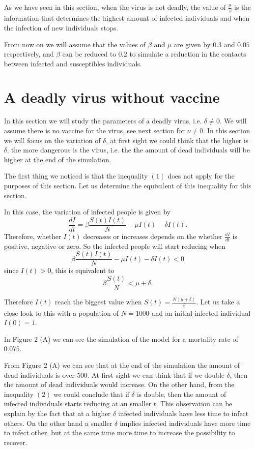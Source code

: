 \documentclass[14pt]{amsart}
\begin{document}
As we have seen in this section, when the virus is not deadly, the value of $\frac{\mu}{\beta}$ is the information that determines the highest amount of infected individuals and when the infection of new individuals stops.

From now on we will assume that the values of $\beta$ and $\mu$ are given by $0.3$ and $0.05$ respectively, and $\beta$ can be reduced to $0.2$ to simulate a reduction in the contacts between infected and susceptibles individuals.

\section{A deadly virus without vaccine}

In this section we will study the parameters of a deadly virus, i.e. $\delta \neq 0$. We will assume there is no vaccine for the virus, see next section for $\nu \neq 0$. In this section we will focus on the variation of $\delta$, at first sight we could think that the higher is $\delta$, the more dangerous is the virus, i.e. the the amount of dead individuals will be higher at the end of the simulation.

The first thing we noticed is that the inequality $(1)$ does not apply for the purposes of this section. Let us determine the equivalent of this inequality for this section.

In this case, the variation of infected people is given by     
$$\frac{d I}{dt}= \beta \frac{S(t)I(t)}{N} -\mu I(t) - \delta I(t).$$
Therefore, whether $I(t)$ decreases or increases depends on the whether $\frac{d I}{dt}$ is positive, negative or zero. So the infected people will start reducing when $$\beta \frac{S(t)I(t)}{N} -\mu I(t) -\delta I(t)< 0$$ since $I(t)> 0$, this is equivalent to 
\begin{equation}
\beta \frac{S(t)}{N} < \mu + \delta.
\end{equation}

Therefore $I(t)$ reach the biggest value when $S(t)=\frac{N(\mu +\delta)}{\beta}$. 
Let us take a close look to this with a population of $N=1000$ and an initial infected individual $I(0)=1$.

In Figure 2 (A) we can see the simulation of the model for a mortality rate of $0.075$.

From Figure 2 (A) we can see that at the end of the simulation the amount of dead individuals is over 500. At first sight we can think that if we double $\delta$, then the amount of dead individuals would increase. On the other hand, from the inequality $(2)$ we could conclude that if $\delta$ is double, then the amount of infected individuals starts reducing at an smaller $t$.
This observation can be explain by the fact that at a higher $\delta$ infected individuals have less time to infect others. On the other hand a smaller $\delta$ implies infected individuals have more time to infect other, but at the same time more time to increase the possibility to recover.
\end{document}
